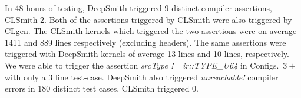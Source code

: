 In 48 hours of testing, DeepSmith triggered 9 distinct compiler assertions, CLSmith 2. Both of the assertions triggered by CLSmith were also triggered by CLgen.
%
%
%
The CLSmith kernels which triggered the two assertions were on average 1411 and 889 lines respectively (excluding headers). The same assertions were triggered with DeepSmith kernels of average 13 lines and 10 lines, respectively. 
%
We were able to trigger the assertion \emph{srcType != ir::TYPE\_U64} in Configs.\ $3\pm$ with only a 3 line test-case.
%
DeepSmith also triggered \emph{unreachable!} compiler errors in 180 distinct test cases, CLSmith triggered 0.



